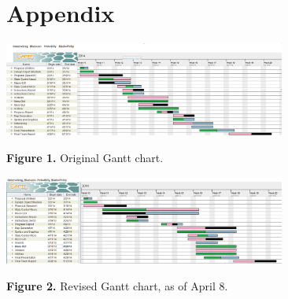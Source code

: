 \documentclass{article}
\begin{document}
\vspace{.3em}

\clearpage

\section*{Appendix}

\begin{center}

\includegraphics[width=350px]{Gantt.png}

{\bf Figure 1.} Original Gantt chart.
\end{center}


\begin{center}

\includegraphics[width=350px]{Gantt2.png}

{\bf Figure 2.} Revised Gantt chart, as of April 8.
\end{center}
\end{document}
